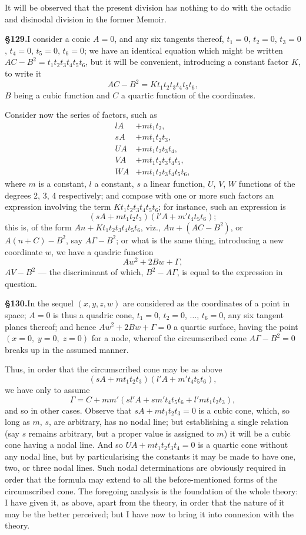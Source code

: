 \documentclass[11pt,a4paper]{article}
\begin{document}
It will be observed that the present division has nothing to do with the octadic and disinodal division in the former Memoir.

\textbf{\S 129.}\quad I consider a conic $A = 0$, and any six tangents thereof, $t_1 = 0$, $t_2 = 0$, $t_3 = 0$, $t_4 = 0$, $t_5 = 0$, $t_6 = 0$; we have an identical equation which might be written $AC - B^2 = t_1t_2t_3t_4t_5t_6$, but it will be convenient, introducing a constant factor $K$, to write it
\[
AC - B^2 = Kt_1t_2t_3t_4t_5t_6,
\]
$B$ being a cubic function and $C$ a quartic function of the coordinates.

Consider now the series of factors, such as
\begin{align*}
lA &+ mt_1t_2, \\
sA &+ mt_1t_2t_3, \\
UA &+ mt_1t_2t_3t_4, \\
VA &+ mt_1t_2t_3t_4t_5, \\
WA &+ mt_1t_2t_3t_4t_5t_6,
\end{align*}
where $m$ is a constant, $l$ a constant, $s$ a linear function, $U$, $V$, $W$ functions of the degrees 2, 3, 4 respectively; and compose with one or more such factors an expression involving the term $Kt_1t_2t_3t_4t_5t_6$; for instance, such an expression is
\[
(sA + mt_1t_2t_3)(l'A + m't_4t_5t_6);
\]
this is, of the form $An + Kt_1t_2t_3t_4t_5t_6$, viz., $An + (AC - B^2)$, or $A(n + C) - B^2$, say $A\Gamma - B^2$; or what is the same thing, introducing a new coordinate $w$, we have a quadric function
\[
Aw^2 + 2Bw + \Gamma,
\]
$AV - B^2$ --- the discriminant of which, $B^2 - A\Gamma$, is equal to the expression in question.

\textbf{\S 130.}\quad In the sequel $(x, y, z, w)$ are considered as the coordinates of a point in space; $A = 0$ is thus a quadric cone, $t_1 = 0$, $t_2 = 0$, $\ldots$, $t_6 = 0$, any six tangent planes thereof; and hence $Aw^2 + 2Bw + \Gamma = 0$ a quartic surface, having the point $(x = 0,\; y = 0,\; z = 0)$ for a node, whereof the circumscribed cone $A\Gamma - B^2 = 0$ breaks up in the assumed manner.

Thus, in order that the circumscribed cone may be as above
\[
(sA + mt_1t_2t_3)(l'A + m't_4t_5t_6),
\]
we have only to assume
\[
\Gamma = C + mm'(sl'A + sm't_4t_5t_6 + l'mt_1t_2t_3),
\]
and so in other cases. Observe that $sA + mt_1t_2t_3 = 0$ is a cubic cone, which, so long as $m$, $s$, are arbitrary, has no nodal line; but establishing a single relation (say $s$ remains arbitrary, but a proper value is assigned to $m$) it will be a cubic cone having a nodal line. And so $UA + mt_1t_2t_3t_4 = 0$ is a quartic cone without any nodal line, but by particularising the constants it may be made to have one, two, or three nodal lines. Such nodal determinations are obviously required in order that the formula may extend to all the before-mentioned forms of the circumscribed cone. The foregoing analysis is the foundation of the whole theory: I have given it, as above, apart from the theory, in order that the nature of it may be the better perceived; but I have now to bring it into connexion with the theory.
\end{document}
